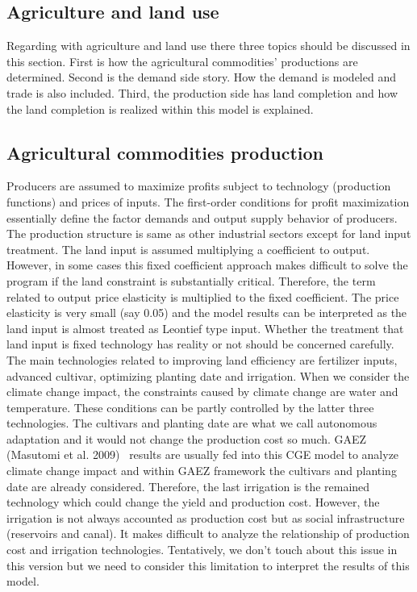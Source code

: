 \documentclass[10pt,a4paper,titlepage,dvipdfmx]{book}
\begin{document}
\begin{itemize}
\section{\label{sec:AgrLanUse}{Agriculture and land use}}

Regarding with agriculture and land use there three topics should be discussed in this section. First is how the agricultural commodities' productions are determined. Second is the demand side story. How the demand is modeled and trade is also included. Third, the production side has land completion and how the land completion is realized within this model is explained.

\subsection{\label{subsec:AgrComPro}{Agricultural commodities production}}

Producers are assumed to maximize profits subject to technology (production functions) and prices of inputs. The first-order conditions for profit maximization essentially define the factor demands and output supply behavior of producers. The production structure is same as other industrial sectors except for land input treatment. The land input is assumed multiplying a coefficient to output. However, in some cases this fixed coefficient approach makes difficult to solve the program if the land constraint is substantially critical. Therefore, the term related to output price elasticity is multiplied to the fixed coefficient. The price elasticity is very small (say 0.05) and the model results can be interpreted as the land input is almost treated as Leontief type input. Whether the treatment that land input is fixed technology has reality or not should be concerned carefully. The main technologies related to improving land efficiency are fertilizer inputs, advanced cultivar, optimizing planting date and irrigation. When we consider the climate change impact, the constraints caused by climate change are water and temperature. These conditions can be partly controlled by the latter three technologies. The cultivars and planting date are what we call autonomous adaptation and it would not change the production cost so much. GAEZ (Masutomi et al. 2009)~\cite{RN2253} results are usually fed into this CGE model to analyze climate change impact and within GAEZ framework the cultivars and planting date are already considered. Therefore, the last irrigation is the remained technology which could change the yield and production cost. However, the irrigation is not always accounted as production cost but as social infrastructure (reservoirs and canal). It makes difficult to analyze the relationship of production cost and irrigation technologies. Tentatively, we don't touch about this issue in this version but we need to consider this limitation to interpret the results of this model.


\end{itemize}
\end{document}
